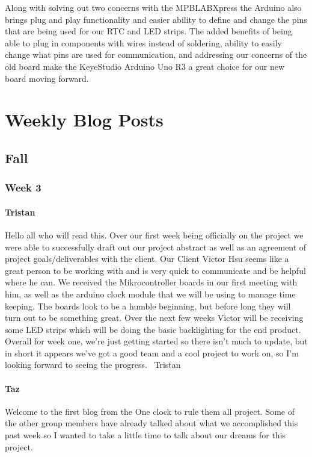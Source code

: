\documentclass[onecolumn, draftclsnofoot,10pt, compsoc]{IEEEtran}
\begin{document}
Along with solving out two concerns with the MPBLABXpress the Arduino also brings plug and play functionality and easier ability to define and change the pins that are being used for our RTC and LED strips. The added benefits of being able to plug in components with wires instead of soldering, ability to easily change what pins are used for communication, and addressing our concerns of the old board make the KeyeStudio Arduino Uno R3 a great choice for our new board moving forward.

\section{Weekly Blog Posts}
\subsection{Fall}
\subsubsection{Week 3}
\paragraph{Tristan}
Hello all who will read this.
Over our first week being officially on the project we were able to successfully draft out our project abstract as well as an agreement of project goals/deliverables with the client. Our Client Victor Hsu seems like a great person to be working with and is very quick to communicate and be helpful where he can. We received the Mikrocontroller boards in our first meeting with him, as well as the arduino clock module that we will be using to manage time keeping. The boards look to be a humble beginning, but before long they will turn out to be something great. Over the next few weeks Victor will be receiving some LED strips which will be doing the basic backlighting for the end product.
Overall for week one, we're just getting started so there isn't much to update, but in short it appears we've got a good team and a cool project to work on, so I'm looking forward to seeing the progress.
~Tristan
\paragraph{Taz}
Welcome to the first blog from the One clock to rule them all project. Some of the other group members have already talked about what we accomplished this past week so I wanted to take a little time to talk about our dreams for this project.
\end{document}
